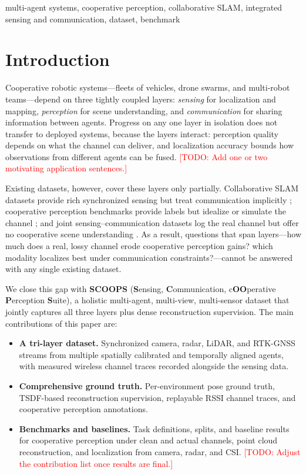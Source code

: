\documentclass[conference]{IEEEtran}
\newcommand{\todo}[1]{\textcolor{red}{[TODO: #1]}}
\begin{document}
\begin{IEEEkeywords}
multi-agent systems, cooperative perception, collaborative SLAM, integrated
sensing and communication, dataset, benchmark
\end{IEEEkeywords}

\section{Introduction}
\label{sec:introduction}
Cooperative robotic systems---fleets of vehicles, drone swarms, and
multi-robot teams---depend on three tightly coupled layers: \emph{sensing}
for localization and mapping, \emph{perception} for scene understanding, and
\emph{communication} for sharing information between agents. Progress on any
one layer in isolation does not transfer to deployed systems, because the
layers interact: perception quality depends on what the channel can deliver,
and localization accuracy bounds how observations from different agents can
be fused. \todo{Add one or two motivating application sentences.}

Existing datasets, however, cover these layers only partially.
Collaborative SLAM datasets provide rich synchronized sensing but treat
communication implicitly \cite{s3e,kimeramulti}; cooperative perception
benchmarks provide labels but idealize or simulate the channel
\cite{opv2v,dairv2x,v2v4real}; and joint sensing--communication datasets log
the real channel but offer no cooperative scene understanding
\cite{deepsense6g}. As a result, questions that span layers---how much does
a real, lossy channel erode cooperative perception gains? which modality
localizes best under communication constraints?---cannot be answered with
any single existing dataset.

We close this gap with \textbf{SCOOPS} (\textbf{S}ensing,
\textbf{C}ommunication, c\textbf{OO}perative \textbf{P}erception
\textbf{S}uite), a holistic multi-agent, multi-view, multi-sensor dataset
that jointly captures all three layers plus dense reconstruction
supervision. The main contributions of this paper are:
\begin{itemize}
    \item \textbf{A tri-layer dataset.} Synchronized camera, radar, LiDAR,
    and RTK-GNSS streams from multiple spatially calibrated and temporally
    aligned agents, with measured wireless channel traces recorded alongside
    the sensing data.
    \item \textbf{Comprehensive ground truth.} Per-environment pose ground
    truth, TSDF-based reconstruction supervision, replayable RSSI channel
    traces, and cooperative perception annotations.
    \item \textbf{Benchmarks and baselines.} Task definitions, splits, and
    baseline results for cooperative perception under clean and actual
    channels, point cloud reconstruction, and localization from camera,
    radar, and CSI.
    \todo{Adjust the contribution list once results are final.}
\end{itemize}
\end{document}
